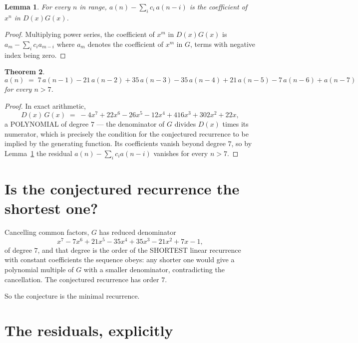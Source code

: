 \documentclass[11pt,a4paper]{article}
\theoremstyle{plain}
\newtheorem{theorem}{Theorem}
\newtheorem{lemma}[theorem]{Lemma}
\theoremstyle{definition}
\begin{document}
\begin{lemma}\label{lem:key}
For every $n$ in range, $a(n)-\sum_i c_i\,a(n-i)$ is the coefficient of $x^{n}$ in
$D(x)G(x)$.
\end{lemma}

\begin{proof}
Multiplying power series, the coefficient of $x^{m}$ in $D(x)G(x)$ is
$a_m-\sum_i c_i a_{m-i}$ where $a_m$ denotes the coefficient of $x^{m}$ in $G$, terms with
negative index being zero.
\end{proof}

\begin{theorem}
\[
a(n)\;=\;7\,a(n-1) - 21\,a(n-2) + 35\,a(n-3) - 35\,a(n-4) + 21\,a(n-5) - 7\,a(n-6) + a(n-7)
\]
for every $n>7$.
\end{theorem}

\begin{proof}
In exact arithmetic,
\[
D(x)\,G(x)\;=\;- 4 x^{7} + 22 x^{6} - 26 x^{5} - 12 x^{4} + 416 x^{3} + 302 x^{2} + 22 x,
\]
a POLYNOMIAL of degree $7$ --- the denominator of $G$ divides $D(x)$ times its numerator,
which is precisely the condition for the conjectured recurrence to be implied by the
generating function. Its coefficients vanish beyond degree $7$, so by
Lemma~\ref{lem:key} the residual $a(n)-\sum_ic_ia(n-i)$ vanishes for every
$n>7$.
\end{proof}

\section{Is the conjectured recurrence the shortest one?}

Cancelling common factors, $G$ has reduced denominator
\[
x^{7} - 7 x^{6} + 21 x^{5} - 35 x^{4} + 35 x^{3} - 21 x^{2} + 7 x - 1,
\]
of degree $7$, and that degree is the order of the SHORTEST linear recurrence with
constant coefficients the sequence obeys: any shorter one would give a polynomial multiple of
$G$ with a smaller denominator, contradicting the cancellation. The conjectured recurrence has
order $7$.

So the conjecture is the minimal recurrence.

\section{The residuals, explicitly}
\end{document}
